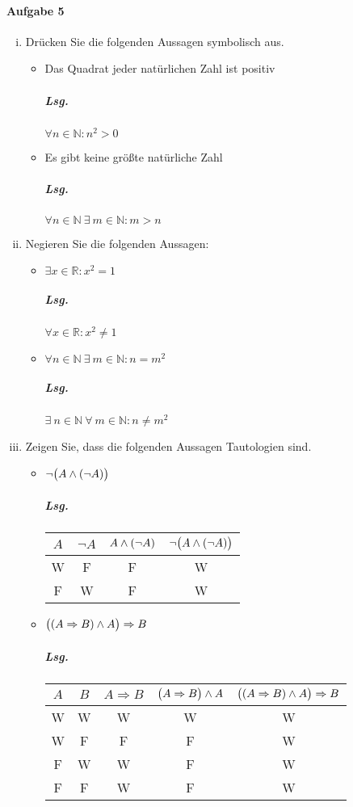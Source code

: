 \documentclass{scrreprt}
\begin{document}
\paragraph{Aufgabe 5}
\begin{enumerate}[(i)]
\item Drücken Sie die folgenden Aussagen symbolisch aus.
  \begin{itemize}
  \item Das Quadrat jeder natürlichen Zahl ist positiv
    \subparagraph{Lsg.} $\forall n \in \mathbb{N} \colon n^2 > 0$

  \item Es gibt keine größte natürliche Zahl
    \subparagraph{Lsg.} $\forall n \in \mathbb{N} \: \exists \: m \in \mathbb{N}
    \colon m > n$
  \end{itemize}

\item Negieren Sie die folgenden Aussagen:
  \begin{itemize}
  \item $\exists x \in \mathbb{R} \colon x^2 = 1$
    \subparagraph{Lsg.} $\forall x \in \mathbb{R} \colon x^2 \ne 1$

  \item $\forall n \in \mathbb{N} \: \exists \: m \in \mathbb{N}
    \colon n = m^2$
    \subparagraph{Lsg.} $\exists \:n \in \mathbb{N}
    \: \forall \: m \in \mathbb{N} \colon n \ne m^2$
  \end{itemize}

\item Zeigen Sie, dass die folgenden Aussagen Tautologien sind.
  \begin{itemize}
  \item $\neg\qty\big(A \land \qty(\neg A))$
    \subparagraph{Lsg.}
    \begin{center}
      \begin{tabular}{c | c | c | c}
        $A$ & $\neg A$ & $A \land \qty(\neg A)$ & $\neg \qty\big(A \land \qty(\neg A))$ \\
        \hline
        W & F & F & W \\
        F & W & F & W
      \end{tabular}
    \end{center}

  \newpage
  \item $\qty\big(\qty(A \Rightarrow B) \land A) \Rightarrow B$
    \subparagraph{Lsg.}
    \begin{center}
      \begin{tabular}{c | c | c | c | c}
        $A$ & $B$ & $A \Rightarrow B$ & $\qty\big(A \Rightarrow B) \land A$ & $\qty\big(\qty(A \Rightarrow B) \land A) \Rightarrow B$ \\
        \hline
        W & W & W & W & W \\
        W & F & F & F & W \\
        F & W & W & F & W \\
        F & F & W & F & W
      \end{tabular}
    \end{center}
  \end{itemize}
\end{enumerate}
\end{document}
